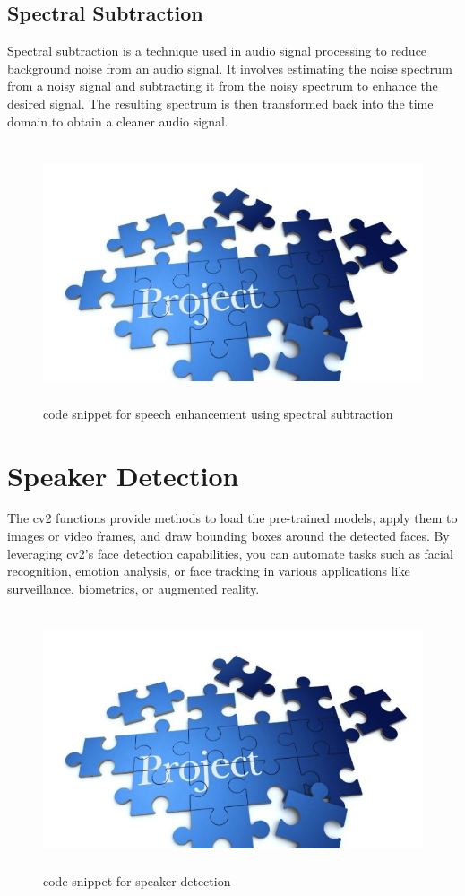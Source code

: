 \documentclass[12pt,a4paper]{report}
\begin{document}
\subsection{Spectral Subtraction}
Spectral subtraction is a technique used in audio signal processing to reduce background noise from an audio signal. It involves estimating the noise spectrum from a noisy signal and subtracting it from the noisy spectrum to enhance the desired signal. The resulting spectrum is then transformed back into the time domain to obtain a cleaner audio signal.
\newpage
\begin{figure}[hbtp]
\centering
\includegraphics[width=5in,height=3in]{./pic/sample.jpg}
\caption{code snippet for speech enhancement using spectral subtraction}
\end{figure}

\section{Speaker Detection}
\par The cv2 functions provide methods to load the pre-trained models, apply them to images or video frames, and draw bounding boxes around the detected faces. By leveraging cv2's face detection capabilities, you can automate tasks such as facial recognition, emotion analysis, or face tracking in various applications like surveillance, biometrics, or augmented reality.


\begin{figure}[hbtp]
\centering
\includegraphics[width=5in,height=3in]{./pic/sample.jpg}
\caption{code snippet for speaker detection}
\end{figure}
\end{document}
